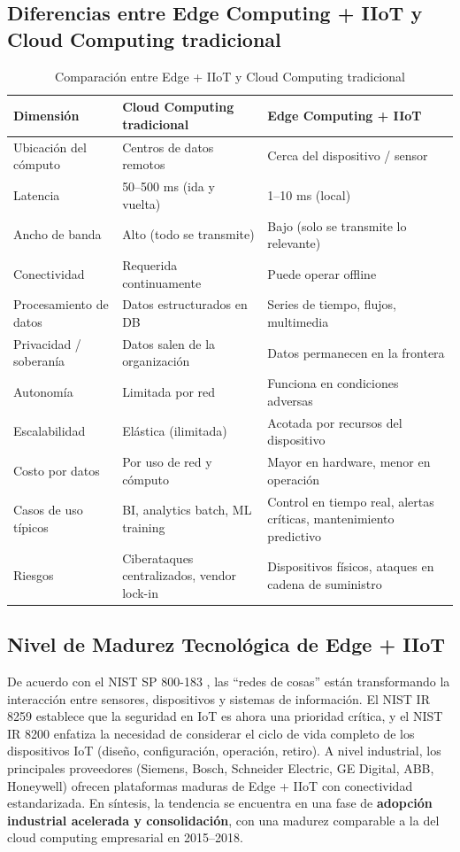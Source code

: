 ﻿\documentclass[12pt,a4paper,oneside]{article}
\begin{document}
\subsection{Diferencias entre Edge Computing + IIoT y Cloud Computing tradicional}

\begin{table}[h!]
\centering
\caption{Comparación entre Edge + IIoT y Cloud Computing tradicional}
\label{tab:comparacion}
\begin{tabular}{p{4.5cm} p{5cm} p{5cm}}
\toprule
\textbf{Dimensión} & \textbf{Cloud Computing tradicional} & \textbf{Edge Computing + IIoT} \\
\midrule
Ubicación del cómputo & Centros de datos remotos & Cerca del dispositivo / sensor \\
Latencia & 50--500 ms (ida y vuelta) & 1--10 ms (local) \\
Ancho de banda & Alto (todo se transmite) & Bajo (solo se transmite lo relevante) \\
Conectividad & Requerida continuamente & Puede operar offline \\
Procesamiento de datos & Datos estructurados en DB & Series de tiempo, flujos, multimedia \\
Privacidad / soberanía & Datos salen de la organización & Datos permanecen en la frontera \\
Autonomía & Limitada por red & Funciona en condiciones adversas \\
Escalabilidad & Elástica (ilimitada) & Acotada por recursos del dispositivo \\
Costo por datos & Por uso de red y cómputo & Mayor en hardware, menor en operación \\
Casos de uso típicos & BI, analytics batch, ML training & Control en tiempo real, alertas críticas, mantenimiento predictivo \\
Riesgos & Ciberataques centralizados, vendor lock-in & Dispositivos físicos, ataques en cadena de suministro \\
\bottomrule
\end{tabular}
\end{table}

\subsection{Nivel de Madurez Tecnológica de Edge + IIoT}

De acuerdo con el NIST SP 800-183 \cite{nistSP800183}, las ``redes de cosas'' están transformando la interacción entre sensores, dispositivos y sistemas de información. El NIST IR 8259 \cite{nistIR8259} establece que la seguridad en IoT es ahora una prioridad crítica, y el NIST IR 8200 \cite{nistIR8200} enfatiza la necesidad de considerar el ciclo de vida completo de los dispositivos IoT (diseño, configuración, operación, retiro). A nivel industrial, los principales proveedores (Siemens, Bosch, Schneider Electric, GE Digital, ABB, Honeywell) ofrecen plataformas maduras de Edge + IIoT con conectividad estandarizada. En síntesis, la tendencia se encuentra en una fase de \textbf{adopción industrial acelerada y consolidación}, con una madurez comparable a la del cloud computing empresarial en 2015--2018.
\end{document}

